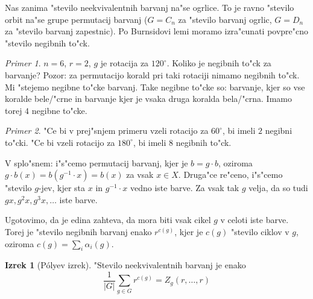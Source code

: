 \documentclass[a4paper,12pt]{article}
\theoremstyle{definition}
\newtheorem{theorem}[counter]{Izrek}
\theoremstyle{remark}
\newtheorem*{ex}{Primer}
\begin{document}
Nas zanima "stevilo neekvivalentnih barvanj na"se ogrlice. To je ravno "stevilo orbit na"se grupe permutacij barvanj ($G=C_n$ za "stevilo barvanj ogrlic, $G=D_n$ za "stevilo barvanj zapestnic).
Po Burnsidovi lemi moramo izra"cunati povpre"cno "stevilo negibnih to"ck.
\begin{ex}
	$n=6$, $r=2$, $g$ je rotacija za $120^{\circ}$. Koliko je negibnih to"ck za barvanje? Pozor: za permutacijo korald pri taki rotaciji nimamo negibnih to"ck. Mi "stejemo negibne to"cke barvanj. Take negibne to"cke so: barvanje, kjer so vse koralde bele/"crne in barvanje kjer je vsaka druga koralda bela/"crna. Imamo torej $4$ negibne to"cke.
\end{ex}
\begin{ex}
	"Ce bi v prej"snjem primeru vzeli rotacijo za $60^{\circ}$, bi imeli $2$ negibni to"cki. "Ce bi vzeli rotacijo za $180^{\circ}$, bi imeli $8$ negibnih to"ck.
\end{ex}

V splo"snem: i"s"cemo permutacij barvanj, kjer je $b = g \cdot b$, oziroma $g\cdot b(x) = b(g^{-1} \cdot x) = b(x)$ za vsak $x \in X$.
Druga"ce re"ceno, i"s"cemo "stevilo $g$-jev, kjer sta $x$ in $g^{-1}\cdot x$ vedno iste barve. Za vsak tak $g$ velja, da so tudi $gx, g^2x, g^3x, \ldots$ iste barve.

Ugotovimo, da je edina zahteva, da mora biti vsak cikel $g$ v celoti iste barve. Torej je "stevilo negibnih barvanj enako $r^{c(g)}$, kjer je $c(g)$ "stevilo ciklov v $g$, oziroma $c(g) = \displaystyle\sum_i \alpha_i(g)$.

\begin{theorem}[P\'{o}lyev izrek]
	"Stevilo neekvivalentnih barvanj je enako
	$$ \frac{1}{\left|G\right| }\sum_{g \in G} r^{c(g)}  = Z_g(r, \ldots, r) $$
\end{theorem}
\end{document}
